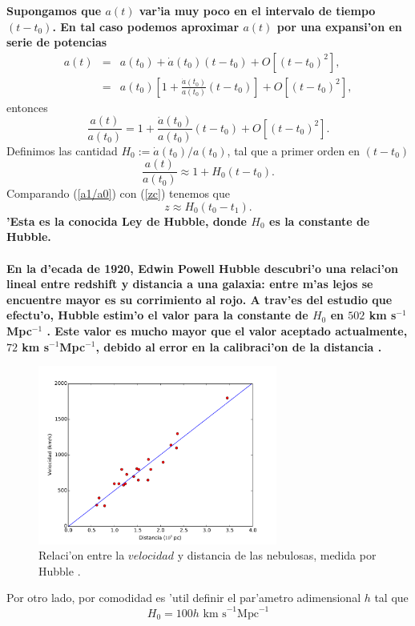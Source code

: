 \textbf{Supongamos que $a(t)$ var'ia muy poco en el intervalo de tiempo $(t-t_{0})$. En tal caso podemos
 aproximar $a(t)$ por una expansi'on en serie de potencias}
\begin{eqnarray}
a(t) &=& a(t_{0})+ \dot{a}(t_{0})(t-t_{0}) +  O\left[(t-t_{0})^2\right],\\
 &=& a(t_{0})\left[1 + \frac{\dot{a}(t_{0})}{a(t_{0})}(t-t_{0})\right] +  O\left[(t-t_{0})^2\right],
\end{eqnarray}
entonces
\begin{equation}
\frac{a(t)}{a(t_{0})} = 1 + \frac{\dot{a}(t_{0})}{a(t_{0})}(t-t_{0}) + O\left[(t-t_{0})^2\right].
\end{equation}
Definimos las cantidad $H_{0}:=\dot{a}(t_{0})/a(t_{0})$, tal que a primer orden en $(t-t_0)$
\begin{equation} 
\frac{a(t)}{a(t_{0})} \approx 1 + H_{0}(t-t_{0}). \label{a1/a0}           
\end{equation}
Comparando (\ref{a1/a0}) con (\ref{zc}) tenemos que 
\begin{equation}
z\approx H_{0}(t_{0}-t_{1}).
\end{equation}
\textbf{'Esta es la conocida Ley de Hubble, donde $H_{0}$ es la constante de Hubble.\\ \\
En la d'ecada de 1920, Edwin Powell Hubble descubri'o una relaci'on lineal entre redshift y distancia a una galaxia: 
entre m'as lejos se encuentre mayor es su corrimiento al rojo. A trav'es del estudio que efectu'o, Hubble estim'o el valor para
la constante de $H_0$ en $502$ km s$^{-1}$Mpc$^{-1}$ \cite{Hubble1}. Este valor es mucho mayor que el valor aceptado actualmente, $72$ km s$^{-1}$Mpc$^{-1}$,
debido al error en la calibraci'on de la distancia \cite{Hubble2}.}\\
\begin{figure}
  \centering
\includegraphics[width=0.7\textwidth]{fig/ajuste.pdf}
 \caption{Relaci'on entre la $velocidad$ y distancia de las nebulosas, medida por Hubble \cite{Hubble1}.}
  \label{hubble}
\end{figure}
Por otro lado, por comodidad es 'util definir el par'ametro adimensional $h$ tal que
\begin{equation}
H_0= 100 h \mbox{ km s}^{-1}\mbox{Mpc}^{-1} \label{h}
\end{equation}

